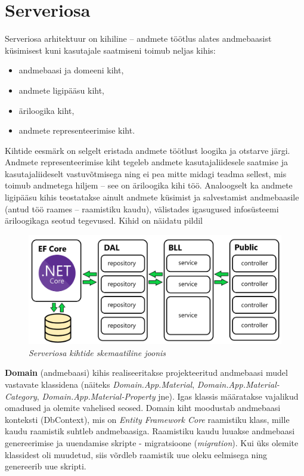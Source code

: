 \section{Serveriosa}
Serveriosa arhitektuur on kihiline -- andmete töötlus alates andmebaasist küsimisest kuni kasutajale saatmiseni toimub neljas kihis:
\begin{itemize}
    \item andmebaasi ja domeeni kiht,
    \item andmete ligipääsu kiht,
    \item äriloogika kiht,
    \item andmete representeerimise kiht.
\end{itemize}
Kihtide eesmärk on selgelt eristada andmete töötlust loogika ja otstarve järgi. Andmete representeerimise kiht tegeleb andmete 
kasutajaliidesele saatmise ja kasutajaliideselt vastuvõtmisega ning ei pea mitte midagi teadma sellest, mis toimub andmetega hiljem --
see on äriloogika kihi töö. Analoogselt ka andmete ligipääsu kihis teostatakse ainult andmete küsimist ja salvestamist andmebaasile
(antud töö raames -- raamistiku kaudu), välistades igasugused infosüsteemi äriloogikaga seotud tegevused. Kihid on näidatu pildil

\begin{figure}[ht]
    \centering
    \includegraphics[width=1\textwidth]{figures/development/backend_structure.png}
    \caption[Serveriosa kihtide skemaatiline joonis]{\textit{Serveriosa kihtide skemaatiline joonis}}
    \label{fig:development_backend_layers}
\end{figure}
 

\textbf{Domain} (andmebaasi) kihis realiseeritakse projekteeritud andmebaasi mudel vastavate klassidena (näiteks \textit{Domain.App.Material},
\textit{Domain.App.Material-Category}, \textit{Domain.App.Material-Property} jne). Igas klassis määratakse vajalikud omadused ja
olemite vahelised seosed. Domain kiht moodustab andmebaasi konteksti (DbContext), mis on \textit{Entity Framework Core} raamistiku klass,
mille kaudu raamistik suhtleb andmebaasiga. Raamistiku kaudu luuakse andmebaasi genereerimise ja uuendamise skripte - migratsioone
(\textit{migration}). Kui üks olemite klassidest oli muudetud, siis võrdleb raamistik uue oleku eelmisega ning genereerib uue skripti.


